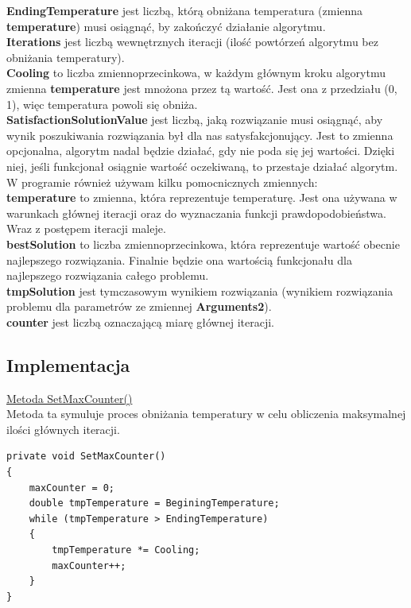\documentclass[twoside]{projektInzynierskiMS1}
\newcommand{\si}{ś}
\begin{document}
\textbf{EndingTemperature} jest liczbą, którą obniżana temperatura (zmienna \textbf{temperature}) musi osiągnąć, by zakończyć działanie algorytmu. \\

\textbf{Iterations} jest liczbą wewnętrznych iteracji (ilo\si ć powtórzeń algorytmu bez obniżania temperatury). \\

\textbf{Cooling} to liczba zmiennoprzecinkowa, w każdym głównym kroku algorytmu zmienna \textbf{temperature} jest mnożona przez tą warto\si ć. Jest ona z przedziału (0, 1), więc temperatura powoli się obniża. \\

\textbf{SatisfactionSolutionValue} jest liczbą, jaką rozwiązanie musi osiągnąć, aby wynik poszukiwania rozwiązania był dla nas satysfakcjonujący. Jest to zmienna opcjonalna, algorytm nadal będzie działać, gdy nie poda się jej warto\si ci. Dzięki niej, je\si li funkcjonał osiągnie warto\si ć oczekiwaną, to przestaje działać algorytm.\\

W programie również używam kilku pomocnicznych zmiennych: \\

\textbf{temperature} to zmienna, która reprezentuje temperaturę. Jest ona używana w warunkach głównej iteracji oraz do wyznaczania funkcji prawdopodobieństwa. Wraz z postępem iteracji maleje. \\

\textbf{bestSolution} to liczba zmiennoprzecinkowa, która reprezentuje warto\si ć obecnie najlepszego rozwiązania. Finalnie będzie ona warto\si cią funkcjonału dla najlepszego rozwiązania całego problemu. \\

\textbf{tmpSolution} jest tymczasowym wynikiem rozwiązania (wynikiem rozwiązania problemu dla parametrów ze zmiennej \textbf{Arguments2}). \\

\textbf{counter} jest liczbą oznaczającą miarę głównej iteracji. \\

\subsection{Implementacja}

\underline{Metoda SetMaxCounter()} \\
Metoda ta symuluje proces obniżania temperatury w celu obliczenia maksymalnej ilo\si ci głównych iteracji. \\
\begin{verbatim}
private void SetMaxCounter()
{
    maxCounter = 0;
    double tmpTemperature = BeginingTemperature;
    while (tmpTemperature > EndingTemperature)
    {
        tmpTemperature *= Cooling;
        maxCounter++;
    }
}
\end{verbatim}
\end{document}
